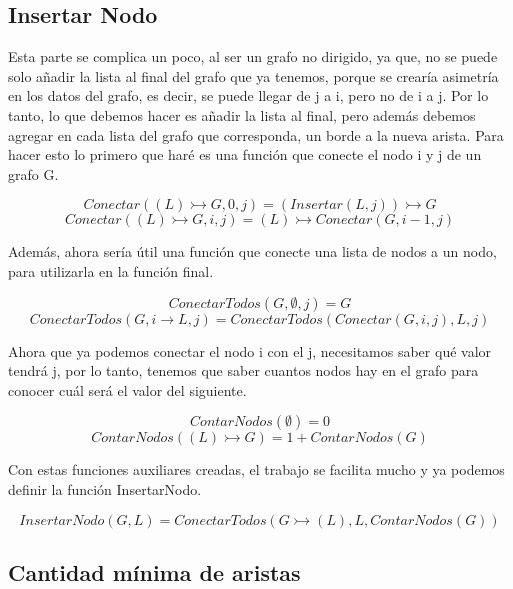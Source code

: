 \documentclass{article}
\begin{document}
\begin{center}
\end{center}

\subsection{Insertar Nodo}
Esta parte se complica un poco, al ser un grafo no dirigido, ya que, no se puede
solo añadir la lista al final del grafo que ya tenemos, porque se crearía 
asimetría en los datos del grafo, es decir, se puede llegar de j a i, pero 
no de i a j.
Por lo tanto, lo que debemos hacer es añadir la lista al final, pero además 
debemos agregar en cada lista del grafo que corresponda, un borde a la nueva 
arista.
Para hacer esto lo primero que haré es una función que conecte el nodo i y j
de un grafo G.

\[ Conectar((L) \rightarrowtail G, 0, j) = (Insertar(L, j)) \rightarrowtail G \]
\[ Conectar((L) \rightarrowtail G, i, j) = (L) \rightarrowtail Conectar(G, i-1, j) \]

Además, ahora sería útil una función que conecte una lista de nodos a un nodo,
para utilizarla en la función final.

\[ ConectarTodos(G, \emptyset, j) = G  \]
\[ ConectarTodos(G, i \rightarrow L, j) = ConectarTodos(Conectar(G, i, j), L, j)  \]

Ahora que ya podemos conectar el nodo i con el j, necesitamos saber qué valor 
tendrá j, por lo tanto, tenemos que saber cuantos nodos hay en el grafo para 
conocer cuál será el valor del siguiente.

\[ ContarNodos(\emptyset) = 0 \]
\[ ContarNodos((L) \rightarrowtail G) = 1 + ContarNodos(G) \]

Con estas funciones auxiliares creadas, el trabajo se facilita mucho y ya 
podemos definir la función InsertarNodo.

\[ InsertarNodo(G, L) = ConectarTodos(G \rightarrowtail (L), L, ContarNodos(G)) \]

\subsection{Cantidad mínima de aristas}
\end{document}
